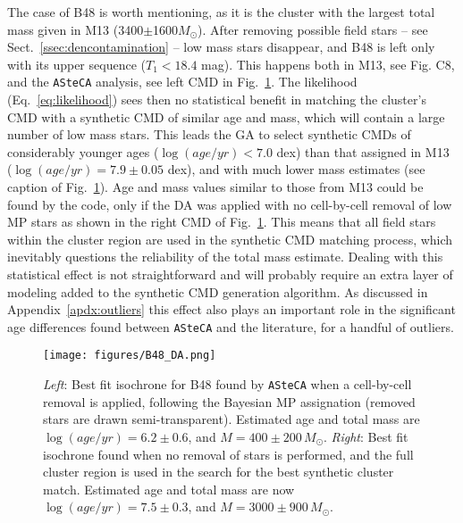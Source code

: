 \documentclass{aa}
\begin{document}
The case of B48 is worth mentioning, as it is the cluster with the largest total
mass given in M13 (3400$\pm$1600$M_{\odot}$).
After removing possible field stars -- see Sect.~\ref{ssec:dencontamination} --
low mass stars disappear, and B48 is left only with its upper sequence 
($T_1<18.4$ mag). This happens both in M13, see Fig. C8, and the
\texttt{ASteCA} analysis, see left CMD in Fig.~\ref{fig:B48_DA}.
%
The likelihood (Eq.~\ref{eq:likelihood}) sees then no statistical benefit in
matching the cluster's CMD with a synthetic CMD of similar age and mass,
which will contain a large number of low mass stars.
This leads the GA to select synthetic CMDs of considerably younger ages
($\log(age/yr){<}7.0$ dex) than that assigned in M13
($\log(age/yr){=}7.9\pm0.05$ dex), and with much lower mass estimates (see
caption of Fig.~\ref{fig:B48_DA}).
%
%
Age and mass values similar to those from M13 could be found by the code, only
if the DA was applied with no cell-by-cell removal of low MP stars as shown in
the right CMD of Fig.~\ref{fig:B48_DA}. This means that all field stars within
the cluster region are used in the synthetic CMD matching process, which
inevitably questions the reliability of the total mass estimate.
%
Dealing with this statistical effect is not straightforward and will probably
require an extra layer of modeling added to the synthetic CMD generation
algorithm.
As discussed in Appendix~\ref{apdx:outliers} this effect also plays an
important role in the significant age differences found between \texttt{ASteCA}
and the literature, for a handful of outliers.

\begin{figure}
\centering
\texttt{[image: figures/B48\_DA.png]}
\caption{\emph{Left}: Best fit isochrone for B48 found by \texttt{ASteCA} when
a cell-by-cell removal is applied, following the Bayesian MP assignation 
(removed stars are drawn semi-transparent). Estimated age and
total mass are $\log(age/yr){=}6.2{\pm}0.6$, and $M{=}400{\pm}200\,M_{\odot}$.
\emph{Right}: Best fit isochrone found when no removal of stars is performed,
and the full cluster region is used in the search for the best synthetic
cluster match. Estimated age and total mass are now
$\log(age/yr){=}7.5{\pm}0.3$, and $M{=}3000{\pm}900\,M_{\odot}$.}
\label{fig:B48_DA}
\end{figure}
\end{document}
